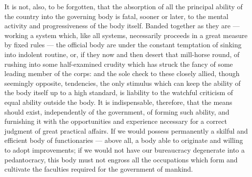 \documentclass[12pt]{report}
\begin{document}
It is not, also, to be forgotten, that the absorption of all the principal ability of the country into the governing body is fatal, sooner or later, to the mental activity and progressiveness of the body itself. Banded together as they are — working a system which, like all systems, necessarily proceeds in a great measure by fixed rules — the official body are under the constant temptation of sinking into indolent routine, or, if they now and then desert that mill-horse round, of rushing into some half-examined crudity which has struck the fancy of some leading member of the corps: and the sole check to these closely allied, though seemingly opposite, tendencies, the only stimulus which can keep the ability of the body itself up to a high standard, is liability to the watchful criticism of equal ability outside the body. It is indispensable, therefore, that the means should exist, independently of the government, of forming such ability, and furnishing it with the opportunities and experience necessary for a correct judgment of great practical affairs. If we would possess permanently a skilful and efficient body of functionaries — above all, a body able to originate and willing to adopt improvements; if we would not have our bureaucracy degenerate into a pedantocracy, this body must not engross all the occupations which form and cultivate the faculties required for the government of mankind.
\end{document}
